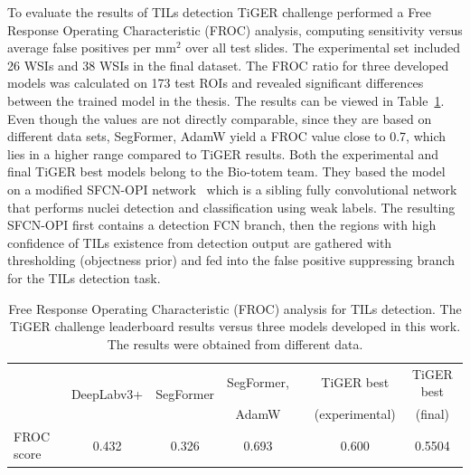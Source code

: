 To evaluate the results of TILs detection TiGER challenge performed a
Free Response Operating Characteristic (FROC) analysis, computing sensitivity
versus average false positives per mm$^2$ over all test slides.
The experimental set included 26 WSIs and 38 WSIs in the final dataset.
The FROC ratio for three developed models was calculated on 173 test ROIs
and revealed significant differences between the trained model in the thesis.
The results can be viewed in Table~\ref{tab:tils_compare}.
Even though the values are not directly comparable, since they are based on different
data sets, SegFormer, AdamW yield a FROC value close to 0.7, which lies in a higher
range compared to TiGER results.
Both the experimental and final TiGER best models belong to the Bio-totem team.
They based the model on a modified SFCN-OPI network~\cite{zhou2018sfcn} which
is a sibling fully convolutional network that performs nuclei detection and
classification using weak labels.  The resulting SFCN-OPI first contains a
detection FCN branch, then the regions with high confidence of TILs
existence from detection output are gathered with thresholding (objectness prior)
and fed into the false positive suppressing branch for the TILs detection task. 

\begin{table}[H]
    \centering
    \begin{tabular}{ l c c c c c c }
        \hline
         & \multirow{2}{*}{DeepLabv3+} & \multirow{2}{*}{SegFormer} & SegFormer, & & TiGER best & TiGER best\\
         &  &  & AdamW & & (experimental) & (final)\\
        \hline
        FROC score & 0.432 & 0.326 & 0.693 & & 0.600 & 0.5504 \\
        \hline
    \end{tabular}
\caption{\label{tab:tils_compare} Free Response Operating Characteristic (FROC)
analysis for TILs detection. The TiGER challenge leaderboard results versus three
models developed in this work. The results were obtained from different data.}
\end{table}

